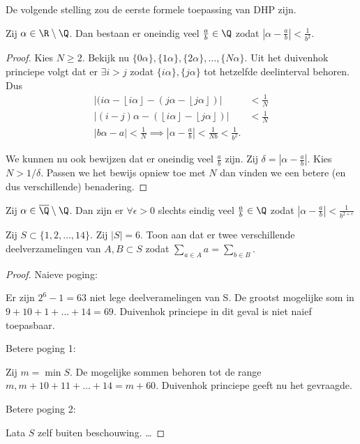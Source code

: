 De volgende stelling zou de eerste formele toepassing van DHP zijn.
\begin{stelling}
	Zij $\alpha \in \R \setminus \Q$. Dan bestaan er oneindig veel $\frac{a}{b} \in \Q$ zodat $|\alpha -\frac{a}{b}| < \frac{1}{b^2}$.
\end{stelling}
\begin{proof}
	Kies $N \ge 2$. Bekijk nu $\{0 \alpha\} , \{1 \alpha\} , \{2 \alpha\} , \ldots, \{N \alpha\} $. Uit het duivenhok princiepe volgt dat er  $\exists i > j$ zodat $\{i \alpha\} , \{ j \alpha\} $ tot hetzelfde deelinterval behoren.
	Dus 
	\begin{align*}
		|(i\alpha  - \left\lfloor i \alpha \right\rfloor - (j\alpha - \left\lfloor j\alpha \right\rfloor ) | &< \frac{1}{N} \\
		|(i -j) \alpha - (\left\lfloor i \alpha \right\rfloor - \left\lfloor j \alpha \right\rfloor)| &< \frac{1}{N}\\
		|b\alpha - a| < \frac{1}{N} \implies |\alpha - \frac{a}{b}| < \frac{1}{Nb} < \frac{1}{b^2}
	.\end{align*}

	We kunnen nu ook bewijzen dat er oneindig veel $\frac{a}{b}$ zijn. Zij $\delta = |\alpha - \frac{a}{b}|$. Kies $N > 1 / \delta$. 
	Passen we het bewijs opniew toe met $N$ dan vinden we een betere (en dus verschillende) benadering.
\end{proof}
\begin{stelling}
	Zij $\alpha \in \overline{\Q} \setminus \Q$. Dan zijn er $\forall \epsilon > 0$ slechts eindig veel $\frac{a}{b} \in \Q$ zodat $|\alpha - \frac{a}{b}| < \frac{1}{b^{2+\epsilon}}$
\end{stelling}

\begin{oef}
Zij $S \subset \{1, 2, \ldots, 14\} $. Zij $|S| = 6$. 	
Toon aan dat er twee verschillende deelverzamelingen van $A, B \subset  S$ zodat $\sum_{a \in A} a = \sum_{b \in B}$. 
\end{oef}
 \begin{proof}
Naieve poging:

Er zijn $2^6 -1 =63$ niet lege deelveramelingen van S. De grootst mogelijke som in $9 + 10 + 1+ \ldots + 14 = 69$. Duivenhok princiepe in dit geval is niet naief toepasbaar.

Betere poging 1:

Zij $m = \min S$. De mogelijke sommen behoren tot de range  $m, m + 10 + 11 + \ldots + 14 = m  + 60$. Duivenhok princiepe geeft nu het gevraagde.

Betere poging 2:

Lata $S$ zelf buiten beschouwing. \ldots
\end{proof}

